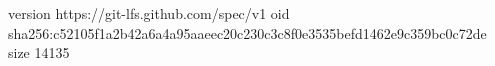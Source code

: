 version https://git-lfs.github.com/spec/v1
oid sha256:c52105f1a2b42a6a4a95aaeec20c230c3c8f0e3535befd1462e9c359bc0c72de
size 14135
